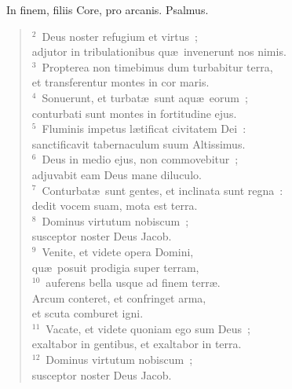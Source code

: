 ~\lettrine[lines=10,image=true,loversize=0.05,lraise=-0.03]{I}{}n finem, filiis Core, pro arcanis. Psalmus.
\begin{flushleft}\begin{verse}\vspace{6pt}${}^{2}$~Deus noster refugium et virtus~;\\ adjutor in tribulationibus qu\ae\ invenerunt nos nimis.\\
${}^{3}$~Propterea non timebimus dum turbabitur terra,\\ et transferentur montes in cor maris.\\
${}^{4}$~Sonuerunt, et turbat\ae\ sunt aqu\ae\ eorum~;\\ conturbati sunt montes in fortitudine ejus.\\
${}^{5}$~Fluminis impetus l\ae tificat civitatem Dei~:\\ sanctificavit tabernaculum suum Altissimus.\\
${}^{6}$~Deus in medio ejus, non commovebitur~;\\ adjuvabit eam Deus mane diluculo.\\
${}^{7}$~Conturbat\ae\ sunt gentes, et inclinata sunt regna~:\\ dedit vocem suam, mota est terra.\\
${}^{8}$~Dominus virtutum nobiscum~;\\ susceptor noster Deus Jacob.\\
${}^{9}$~Venite, et videte opera Domini,\\ qu\ae\ posuit prodigia super terram,\\
${}^{10}$~auferens bella usque ad finem terr\ae .\\ Arcum conteret, et confringet arma,\\ et scuta comburet igni.\\
${}^{11}$~Vacate, et videte quoniam ego sum Deus~;\\ exaltabor in gentibus, et exaltabor in terra.\\
${}^{12}$~Dominus virtutum nobiscum~;\\ susceptor noster Deus Jacob.\end{verse}\end{flushleft}


